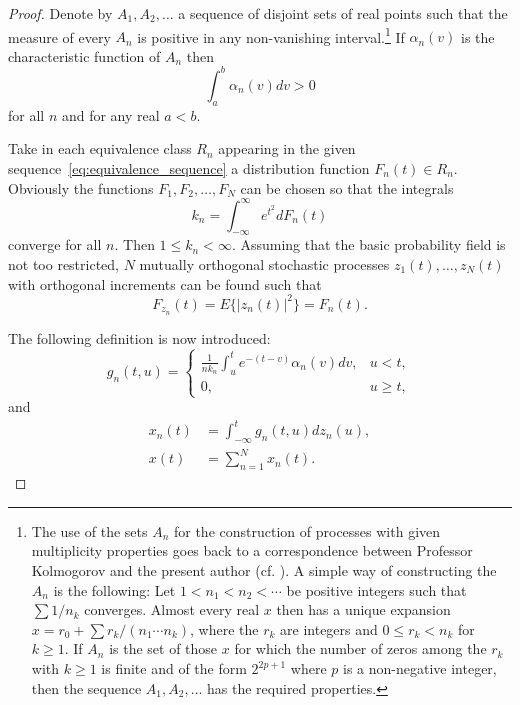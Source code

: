\documentclass[11pt]{article}
\begin{document}
\begin{proof}
Denote by $A_1, A_2, \ldots$ a sequence of disjoint sets of real points such that the measure of every $A_n$ is positive in any non-vanishing interval.\footnote{The use of the sets $A_n$ for the construction of processes with given multiplicity properties goes back to a correspondence between Professor Kolmogorov and the present author (cf. \cite{cramer1962}). A simple way of constructing the $A_n$ is the following: Let $1 < n_1 < n_2 < \cdots$ be positive integers such that $\sum 1/n_k$ converges. Almost every real $x$ then has a unique expansion $x = r_0 + \sum r_k/(n_1 \cdots n_k)$, where the $r_k$ are integers and $0 \leq r_k < n_k$ for $k \geq 1$. If $A_n$ is the set of those $x$ for which the number of zeros among the $r_k$ with $k \geq 1$ is finite and of the form $2^{2p+1}$ where $p$ is a non-negative integer, then the sequence $A_1, A_2, \ldots$ has the required properties.} If $\alpha_n(v)$ is the characteristic function of $A_n$ then
\begin{equation}
\int_a^b \alpha_n(v) dv > 0
\label{eq:positive_measure}
\end{equation}
for all $n$ and for any real $a < b$.

Take in each equivalence class $R_n$ appearing in the given sequence~\eqref{eq:equivalence_sequence} a distribution function $F_n(t) \in R_n$. Obviously the functions $F_1, F_2, \ldots, F_N$ can be chosen so that the integrals
\begin{equation}
k_n = \int_{-\infty}^{\infty} e^{t^2} dF_n(t)
\label{eq:moment_integral}
\end{equation}
converge for all $n$. Then $1 \leq k_n < \infty$. Assuming that the basic probability field is not too restricted, $N$ mutually orthogonal stochastic processes $z_1(t), \ldots, z_N(t)$ with orthogonal increments can be found such that
\begin{equation}
F_{z_n}(t) = E\{|z_n(t)|^2\} = F_n(t).
\label{eq:process_distribution}
\end{equation}

The following definition is now introduced:
\begin{equation}
g_n(t, u) = \begin{cases}
\frac{1}{nk_n} \int_u^t e^{-(t-v)} \alpha_n(v) dv, & u < t, \\
0, & u \geq t,
\end{cases}
\label{eq:kernel_function}
\end{equation}
and
\begin{align}
x_n(t) &= \int_{-\infty}^t g_n(t, u) dz_n(u), \label{eq:component_process}\\
x(t) &= \sum_{n=1}^N x_n(t). \label{eq:total_process}
\end{align}


\end{proof}
\end{document}
